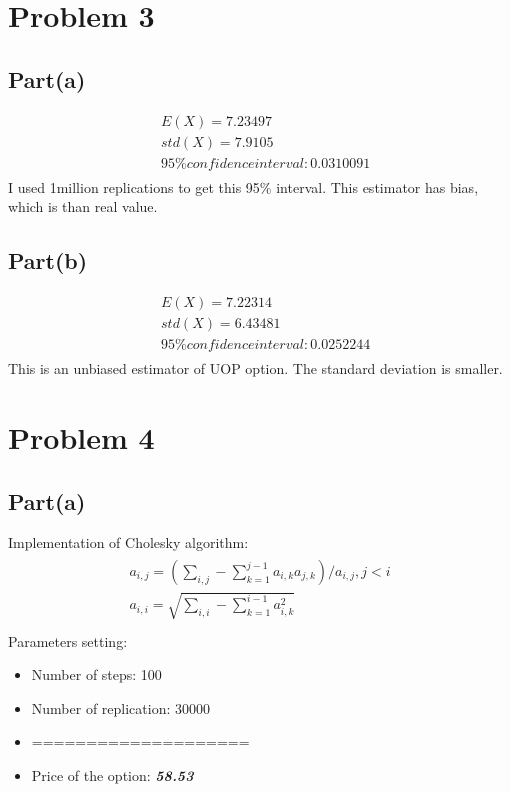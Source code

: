 \documentclass{report}
\begin{document}
	
\newpage
\section*{Problem 3}
\subsection*{Part(a)} 
\begin{align*} 
&E(X)= 7.23497\\
&std(X)= 7.9105\\
&95\% confidence interval: 0.0310091\\
\end{align*}
I used 1million replications to get this 95\% interval.  This estimator has bias, which is  than real value. 

\subsection*{Part(b)}
\begin{align*} 
&E(X)= 7.22314\\
&std(X)= 6.43481\\
&95\% confidence interval: 0.0252244\\
\end{align*}
This is an unbiased estimator of UOP option. The standard deviation is smaller. 

\newpage
\section*{Problem 4} 
\subsection*{Part(a)}
Implementation of Cholesky algorithm: 
\begin{align*}\begin{array}{l}
a_{i,j}=(\sum_{i,j}-\sum_{k=1}^{j-1}a_{i,k}a_{j,k})/a_{i,j}, j<i\\
a_{i,i}=\sqrt{\sum_{i,i}-\sum_{k=1}^{i-1}a_{i,k}^2}\\
\end{array}\end{align*} 
Parameters setting: 
\begin{itemize} 
\item Number of steps: 100
\item Number of replication: 30000
\item ====================
\item Price of the option: \em \textbf{58.53}
\end{itemize}
\end{document}
